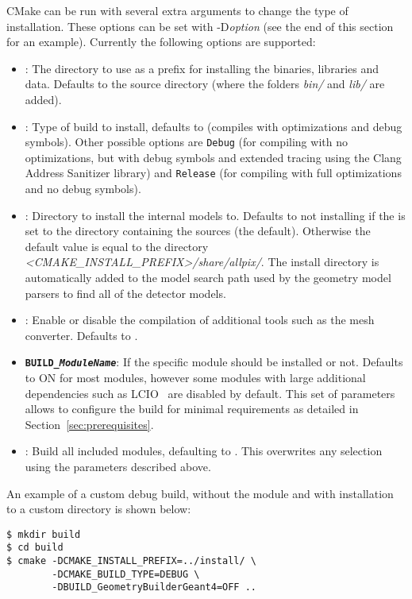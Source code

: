 CMake can be run with several extra arguments to change the type of installation.
These options can be set with -D\textit{option} (see the end of this section for an example).
Currently the following options are supported:
\begin{itemize}
\item {}: The directory to use as a prefix for installing the binaries, libraries and data.
Defaults to the source directory (where the folders \textit{bin/} and \textit{lib/} are added).
\item {}: Type of build to install, defaults to  (compiles with optimizations and debug symbols).
Other possible options are \texttt{Debug} (for compiling with no optimizations, but with debug symbols and extended tracing using the Clang Address Sanitizer library) and \texttt{Release} (for compiling with full optimizations and no debug symbols).
\item {}: Directory to install the internal models to.
Defaults to not installing if the  is set to the directory containing the sources (the default).
Otherwise the default value is equal to the directory \textit{<CMAKE\_INSTALL\_PREFIX>/share/allpix/}.
The install directory is automatically added to the model search path used by the geometry model parsers to find all of the detector models.
\item {}: Enable or disable the compilation of additional tools such as the mesh converter. Defaults to .
\item \textbf{\texttt{BUILD\_\textit{ModuleName}}}: If the specific module  should be installed or not.
Defaults to ON for most modules, however some modules with large additional dependencies such as LCIO~\cite{lcio} are disabled by default.
This set of parameters allows to configure the build for minimal requirements as detailed in Section~\ref{sec:prerequisites}.
\item {}: Build all included modules, defaulting to .
This overwrites any selection using the parameters described above.
\end{itemize}

An example of a custom debug build, without the  module and with installation to a custom directory is shown below:
\begin{verbatim}
$ mkdir build
$ cd build
$ cmake -DCMAKE_INSTALL_PREFIX=../install/ \
        -DCMAKE_BUILD_TYPE=DEBUG \
        -DBUILD_GeometryBuilderGeant4=OFF ..
\end{verbatim}

